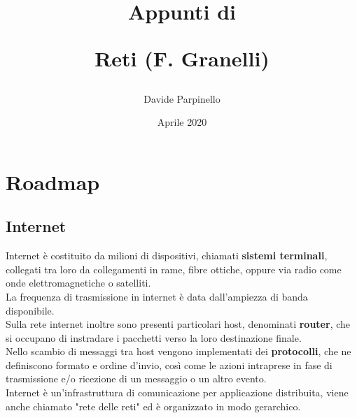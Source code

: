 \documentclass{report}
\begin{document}
	
	\author{Davide Parpinello}
	\title{%
			\begin{Large}
				Appunti di\\
			\end{Large}
		Reti (F. Granelli)}
	\date{Aprile 2020}
	\maketitle
	
	\tableofcontents
	\renewcommand{\chaptermark}[1]{%
		\markboth{#1}{}}
	\pagestyle{fancy}
	\fancyhf{}
	\lhead{\leftmark}
	\rfoot{\thepage}
	
	\chapter{Roadmap}
	\section{Internet}
	
	Internet è costituito da milioni di dispositivi, chiamati \textbf{sistemi terminali}, collegati tra loro da collegamenti in rame, fibre ottiche, oppure via radio come onde elettromagnetiche o satelliti.
	\medskip\\
	La frequenza di trasmissione in internet è data dall'ampiezza di banda disponibile.
	\medskip\\Sulla rete internet inoltre sono presenti particolari host, denominati \textbf{router}, che si occupano di instradare i pacchetti verso la loro destinazione finale.
	\medskip\\Nello scambio di messaggi tra host vengono implementati dei \textbf{protocolli}, che ne definiscono formato e ordine d'invio, così come le azioni intraprese in fase di trasmissione e/o ricezione di un messaggio o un altro evento.
	\medskip\\Internet è un'infrastruttura di comunicazione per applicazione distribuita, viene anche chiamato "rete delle reti" ed è organizzato in modo gerarchico.
\end{document}
